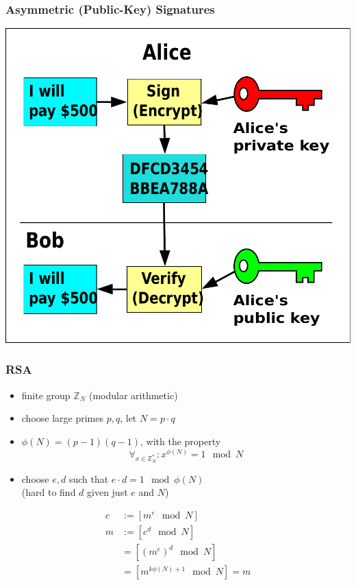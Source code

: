 \documentclass{beamer}
\begin{document}
\begin{frame}
  \frametitle{Asymmetric (Public-Key) Signatures}

\includegraphics[height=0.5\textheight]{Public_key_signing}

\end{frame}

\begin{frame}
  \frametitle{RSA}

  \begin{itemize}
    \item finite group $\mathbb{Z}_N$ (modular arithmetic)
    \item choose large primes $p, q$, let $N = p \cdot q$
    \item $\phi(N) = (p - 1)(q - 1)$, with the property $$\forall_{x\in\mathbb{Z}^*_N}: x^{\phi(N)} = 1 \mod N$$
    \item choose $e, d$ such that $e \cdot d = 1 \mod \phi(N)$\\
    (hard to find $d$ given just $e$ and $N$)
  \end{itemize}
  \begin{align*}
  c &:= [m^e \mod N]\\
  m &:= [c^d \mod N]\\
    &= [(m^e)^d \mod N]\\
    &= [m^{k\phi(N) + 1} \mod N] = m
  \end{align*}
\end{frame}
\end{document}
